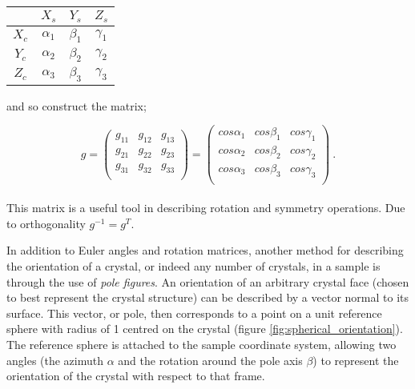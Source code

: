 \documentclass[a4paper,12pt]{report}
\numberwithin{equation}{chapter}
\begin{document}
\begin{table}[h!]
    \centering
	\begin{tabular}{c | c c c}

	  & $X_s$      & $Y_s$      & $Z_s$ \\
\hline
$X_c$ & $\alpha_1$ & $\beta_1$ & $\gamma_1$ \\
$Y_c$ & $\alpha_2$ & $\beta_2$ & $\gamma_2$ \\
$Z_c$ & $\alpha_3$ & $\beta_3$ & $\gamma_3$ \\

	\end{tabular}
\end{table}
\noindent
and so construct the matrix;

\begin{equation}
g = 
\begin{pmatrix}
g_{11} & g_{12} & g_{13} \\
g_{21} & g_{22} & g_{23} \\
g_{31} & g_{32} & g_{33} \\
\end{pmatrix}
= 
\begin{pmatrix}
cos \alpha_1 & cos \beta_1 & cos \gamma_1 \\
cos \alpha_2 & cos \beta_2 & cos \gamma_2 \\
cos \alpha_3 & cos \beta_3 & cos \gamma_3 \\
\end{pmatrix}\ .
\end{equation}
\\
This matrix is a useful tool in describing rotation and symmetry operations. Due to orthogonality $g^{-1} = g^T$. 



In addition to Euler angles and rotation matrices, another method for describing the orientation of a crystal, or indeed any number of crystals, in a sample is through the use of \emph{pole figures}. An orientation of an arbitrary crystal face (chosen to best represent the crystal structure) can be described by a vector normal to its surface. This vector, or pole, then corresponds to a point on a unit reference sphere with radius of 1 centred on the crystal (figure \ref{fig:spherical_orientation}). The reference sphere is attached to the sample coordinate system, allowing two angles (the azimuth $\alpha$ and the rotation around the pole axis $\beta$) to represent the orientation of the crystal with respect to that frame.  
\end{document}
